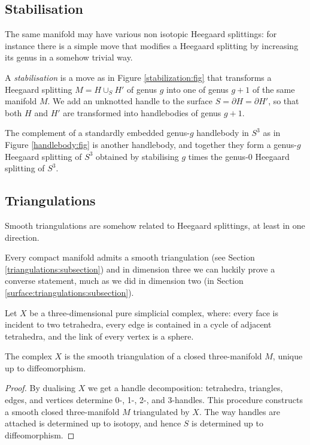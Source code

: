 \subsection{Stabilisation}
The same manifold may have various non isotopic Heegaard splittings: for instance there is a simple move that modifies a Heegaard splitting by increasing its genus in a somehow trivial way.

A \emph{stabilisation} is a move as in Figure \ref{stabilization:fig} that transforms a Heegaard splitting $M=H\cup_S H'$ of genus $g$ into one of genus $g+1$ of the same manifold $M$. We add an unknotted handle to the surface $S=\partial H = \partial H'$, so that both $H$ and $H'$ are transformed into handlebodies of genus $g+1$. 

\begin{example} \label{S3:example}
The complement of a standardly embedded genus-$g$ handlebody in $S^3$ as in Figure \ref{handlebody:fig} is another handlebody, and together they form a genus-$g$ Heegaard splitting of $S^3$ obtained by stabilising $g$ times the genus-0 Heegaard splitting of $S^3$.
\end{example}

\subsection{Triangulations}
Smooth triangulations are somehow related to Heegaard splittings, at least in one direction. 

Every compact manifold admits a smooth triangulation (see Section \ref{triangulations:subsection}) and in dimension three we can luckily prove a converse statement, much as we did in dimension two (in Section \ref{surface:triangulations:subsection}).

Let $X$ be a three-dimensional pure simplicial complex, where: every face is incident to two tetrahedra, every edge is contained in a cycle of adjacent tetrahedra, and the link of every vertex is a sphere.

\begin{prop} \label{X:triangulation:prop}
The complex $X$ is the smooth triangulation of a closed three-manifold $M$, unique up to diffeomorphism.
\end{prop}
\begin{proof}
By dualising $X$ we get a handle decomposition: tetrahedra, triangles, edges, and vertices determine 0-, 1-, 2-, and 3-handles. This procedure constructs a smooth closed three-manifold $M$ triangulated by $X$. The way handles are attached is determined up to isotopy, and hence $S$ is determined up to diffeomorphism.
\end{proof}

